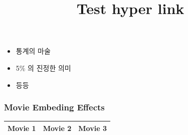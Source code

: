 \documentclass{beamer}
\begin{document}
\begin{frame}
\begin{itemize}[<+->]
\item 통계의 마술
\item 5\% 의 진정한 의미
\item 등등
\end{itemize}
\hypertarget<2>{item:second}{}
\end{frame}

\begin{frame}
\title{Test hyper link}
\hyperlink{item:second}{}
\hyperlink{item:second}{}
\hyperlink{item:second}{}
\end{frame}


\begin{frame}
\frametitle{Movie Embeding Effects}
\begin{center}

\begin{tabular}{|c|c|c|} \hline
Movie 1 & Movie 2 & Movie 3 \\ \hline
\end{tabular}
\end{center}

\end{frame}

\end{document}

